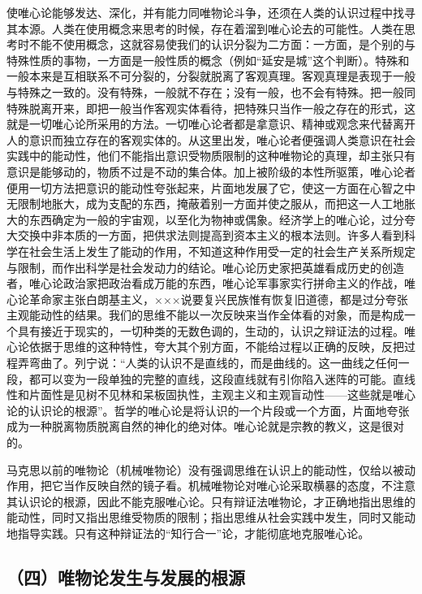 使唯心论能够发达、深化，并有能力同唯物论斗争，还须在人类的认识过程中找寻其本源。人类在使用概念来思考的时候，存在着溜到唯心论去的可能性。人类在思考时不能不使用概念，这就容易使我们的认识分裂为二方面：一方面，是个别的与特殊性质的事物，一方面是一般性质的概念（例如“延安是城”这个判断）。特殊和一般本来是互相联系不可分裂的，分裂就脱离了客观真理。客观真理是表现于一般与特殊之一致的。没有特殊，一般就不存在；没有一般，也不会有特殊。把一般同特殊脱离开来，即把一般当作客观实体看待，把特殊只当作一般之存在的形式，这就是一切唯心论所采用的方法。一切唯心论者都是拿意识、精神或观念来代替离开人的意识而独立存在的客观实体的。从这里出发，唯心论者便强调人类意识在社会实践中的能动性，他们不能指出意识受物质限制的这种唯物论的真理，却主张只有意识是能够动的，物质不过是不动的集合体。加上被阶级的本性所驱策，唯心论者便用一切方法把意识的能动性夸张起来，片面地发展了它，使这一方面在心智之中无限制地胀大，成为支配的东西，掩蔽着别一方面并使之服从，而把这一人工地胀大的东西确定为一般的宇宙观，以至化为物神或偶象。经济学上的唯心论，过分夸大交换中非本质的一方面，把供求法则提高到资本主义的根本法则。许多人看到科学在社会生活上发生了能动的作用，不知道这种作用受一定的社会生产关系所规定与限制，而作出科学是社会发动力的结论。唯心论历史家把英雄看成历史的创造者，唯心论政治家把政治看成万能的东西，唯心论军事家实行拼命主义的作战，唯心论革命家主张白朗基主义，×××说要复兴民族惟有恢复旧道德，都是过分夸张主观能动性的结果。我们的思维不能以一次反映来当作全体看的对象，而是构成一个具有接近于现实的，一切种类的无数色调的，生动的，认识之辩证法的过程。唯心论依据于思维的这种特性，夸大其个别方面，不能给过程以正确的反映，反把过程弄弯曲了。列宁说：“人类的认识不是直线的，而是曲线的。这一曲线之任何一段，都可以变为一段单独的完整的直线，这段直线就有引你陷入迷阵的可能。直线性和片面性是见树不见林和呆板固执性，主观主义和主观盲动性——这些就是唯心论的认识论的根源”。哲学的唯心论是将认识的一个片段或一个方面，片面地夸张成为一种脱离物质脱离自然的神化的绝对体。唯心论就是宗教的教义，这是很对的。

马克思以前的唯物论（机械唯物论）没有强调思维在认识上的能动性，仅给以被动作用，把它当作反映自然的镜子看。机械唯物论对唯心论采取横暴的态度，不注意其认识论的根源，因此不能克服唯心论。只有辩证法唯物论，才正确地指出思维的能动性，同时又指出思维受物质的限制；指出思维从社会实践中发生，同时又能动地指导实践。只有这种辩证法的“知行合一”论，才能彻底地克服唯心论。

\subsection{（四）唯物论发生与发展的根源}

